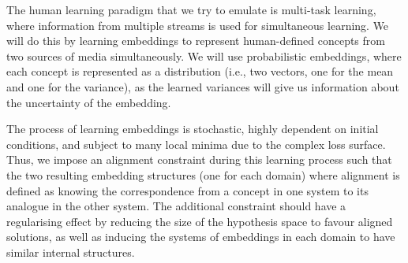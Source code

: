 The human learning paradigm that we try to emulate is multi-task learning, where information from multiple streams is used for simultaneous learning. We will do this by learning embeddings to represent human-defined concepts from two sources of media simultaneously. We will use probabilistic embeddings, where each concept is represented as a distribution (i.e., two vectors, one for the mean and one for the variance), as the learned variances will give us information about the uncertainty of the embedding. 

The process of learning embeddings is stochastic, highly dependent on initial conditions, and subject to many local minima due to the complex loss surface. Thus, we impose an alignment constraint during this learning process such that the two resulting embedding structures (one for each domain) where alignment is defined as knowing the correspondence from a concept in one system to its analogue in the other system. The additional constraint should have a regularising effect by reducing the size of the hypothesis space to favour aligned solutions, as well as inducing the systems of embeddings in each domain to have similar internal structures. 




